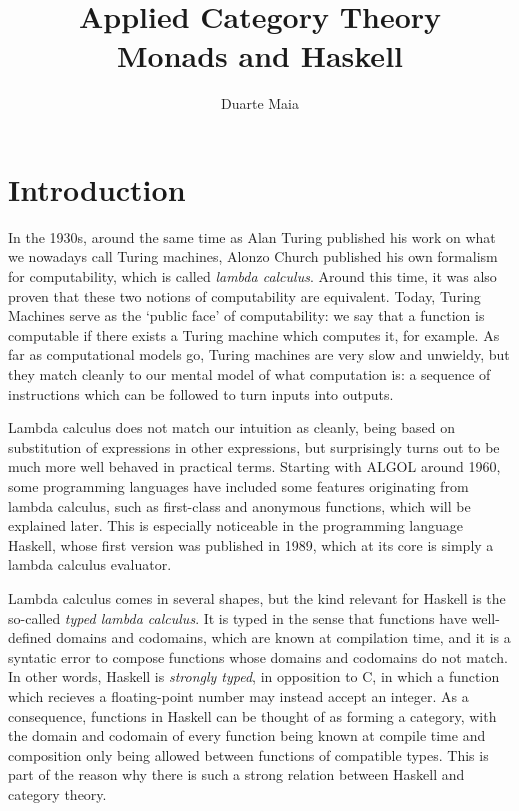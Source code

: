 \documentclass[11pt]{article}
\title{Applied Category Theory\\
Monads and Haskell}
\author{Duarte Maia}
\theoremstyle{nonumberplain}
\begin{document}
\maketitle
\pagebreak

\tableofcontents
\pagebreak

\section{Introduction}

In the 1930s, around the same time as Alan Turing published his work on what we nowadays call Turing machines, Alonzo Church published his own formalism for computability, which is called \emph{lambda calculus}. Around this time, it was also proven that these two notions of computability are equivalent. Today, Turing Machines serve as the `public face' of computability: we say that a function is computable if there exists a Turing machine which computes it, for example. As far as computational models go, Turing machines are very slow and unwieldy, but they match cleanly to our mental model of what computation is: a sequence of instructions which can be followed to turn inputs into outputs.

Lambda calculus does not match our intuition as cleanly, being based on substitution of expressions in other expressions, but surprisingly turns out to be much more well behaved in practical terms. Starting with ALGOL around 1960, some programming languages have included some features originating from lambda calculus, such as first-class and anonymous functions, which will be explained later. This is especially noticeable in the programming language Haskell, whose first version was published in 1989, which at its core is simply a lambda calculus evaluator.

Lambda calculus comes in several shapes, but the kind relevant for Haskell is the so-called \emph{typed lambda calculus}. It is typed in the sense that functions have well-defined domains and codomains, which are known at compilation time, and it is a syntatic error to compose functions whose domains and codomains do not match. In other words, Haskell is \emph{strongly typed}, in opposition to C, in which a function which recieves a floating-point number may instead accept an integer. As a consequence, functions in Haskell can be thought of as forming a category, with the domain and codomain of every function being known at compile time and composition only being allowed between functions of compatible types. This is part of the reason why there is such a strong relation between Haskell and category theory.
\end{document}
